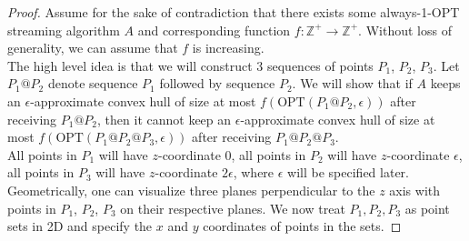 \begin{proof}
Assume for the sake of contradiction that there exists some always-1-OPT streaming algorithm $A$ and corresponding function $f : \mathbb{Z}^+ \to \mathbb{Z}^+$. Without loss of generality, we can assume that $f$ is increasing.
\\

The high level idea is that we will construct 3 sequences of points $P_1$, $P_2$, $P_3$. Let $P_1 @ P_2$ denote sequence $P_1$ followed by sequence $P_2$. We will show that if $A$ keeps an $\epsilon$-approximate convex hull of size at most $f(\mbox{OPT}(P_1 @ P_2, \epsilon))$ after receiving $P_1 @ P_2$, then it cannot keep an $\epsilon$-approximate convex hull of size at most $f(\mbox{OPT}(P_1 @ P_2 @ P_3, \epsilon))$ after receiving $P_1 @ P_2 @ P_3$.
\\

All points in $P_1$ will have $z$-coordinate 0, all points in $P_2$ will have $z$-coordinate $\epsilon$, all points in $P_3$ will have $z$-coordinate $2\epsilon$, where $\epsilon$ will be specified later. Geometrically, one can visualize three planes perpendicular to the $z$ axis with points in $P_1$, $P_2$, $P_3$ on their respective planes. We now treat $P_1, P_2, P_3$ as point sets in 2D and specify the $x$ and $y$ coordinates of points in the sets.


\end{proof}
